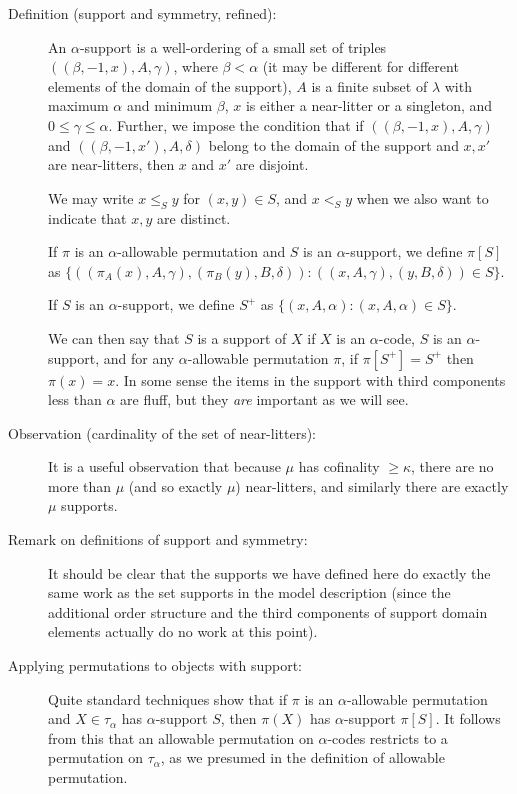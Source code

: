 \begin{description}

\item[Definition (support and symmetry, refined):]  An $\alpha$-support is a well-ordering of a small set of triples $((\beta,-1,x),A,\gamma)$, where $\beta<\alpha$ (it may be different for different elements of the domain of the support), $A$ is a finite subset of $\lambda$ with maximum $\alpha$ and minimum $\beta$, $x$ is either a near-litter or a singleton, and $0 \leq \gamma \leq\alpha$.  Further, we impose the condition that if $((\beta,-1,x),A,\gamma)$ and $((\beta,-1,x'),A,\delta)$ belong to the domain of the support and $x,x'$ are near-litters, then $x$ and $x'$ are disjoint.

We may write $x \leq_S y$ for $(x,y) \in S$, and $x <_S y$ when we also want to indicate that $x,y$ are distinct.

If $\pi$ is an $\alpha$-allowable permutation and $S$ is an $\alpha$-support, we define $\pi[S]$ as $\{((\pi_A(x),A,\gamma),(\pi_B(y),B,\delta)):((x,A,\gamma),(y,B,\delta))\in S\}$.

If $S$ is an $\alpha$-support, we define $S^+$ as $\{(x,A,\alpha):(x,A,\alpha) \in S\}$.

We can then say that $S$ is a support of $X$ if $X$ is an $\alpha$-code, $S$ is an $\alpha$-support, and for any $\alpha$-allowable permutation $\pi$, if $\pi[S^+]=S^+$ then $\pi(x)=x$.  In some sense the items in the support with third components less than $\alpha$ are fluff, but they {\em are\/} important as we will see.

\item[Observation (cardinality of the set of near-litters):]  It is a useful observation that because $\mu$ has cofinality $\geq \kappa$, there are no more than $\mu$ (and so exactly $\mu$) near-litters,
and similarly there are exactly $\mu$ supports.

\item[Remark on definitions of support and symmetry:]  It should be clear that the supports we have defined here do exactly the same work as the set supports in the model description (since the additional order structure and the third components of support domain elements actually do no work at this point).

\item[Applying permutations to objects with support:]  Quite standard techniques show that if $\pi$ is an $\alpha$-allowable permutation and $X \in \tau_\alpha$ has $\alpha$-support $S$, then $\pi(X)$ has $\alpha$-support $\pi[S]$.   It follows from this that an allowable permutation on $\alpha$-codes restricts to a permutation on $\tau_\alpha$, as we presumed in the definition of allowable permutation.


\end{description}
